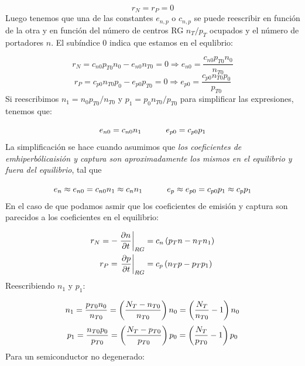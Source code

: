 \begin{equation}
	r_N = r_P = 0
\end{equation}
Luego tenemos que una de las constantes $e_{n,p}$ o $c_{n,p}$ se puede reescribir en función de la otra y en función del número de centros RG $n_T/p_T$ ocupados y el número de portadores $n$. El subíndice $0$ indica que estamos en el equlibrio:

\begin{equation}
	r_N = c_{n0} p_{T0} n_0 - e_{n0} n_{T0} = 0 \Rightarrow e_{n0} = \frac{c_{n0} p_{T0}n_0}{n_{T0}}
\end{equation}
\begin{equation}
	r_P = c_{p0} n_{T0} p_0 - e_{p0} p_{T0} = 0 \Rightarrow e_{p0} = \frac{c_{p0} n_{T0} p_0 }{p_{T0}}
\end{equation}
Si reescribimos $n_1=n_0p_{T0}/n_{T0}$ y $p_1=p_0n_{T0}/p_{T0}$ para simplificar las expresiones, tenemos que:

\begin{equation}
	e_{n0} = c_{n0} n_1 \quad \quad \quad e_{p0} = c_{p0} p_1
\end{equation}
La simplificación se hace cuando asumimos que \textit{los coeficientes de emhiperbólicaisión y captura son aproximadamente los mismos en el equilibrio y fuera del equilibrio}, tal que

\begin{equation}
	e_n\approx e_{n0} = c_{n0} n_1 \approx c_n n_1 \quad \quad \quad
	e_p\approx e_{p0} = c_{p0} p_1 \approx c_p p_1
\end{equation}
En el caso de que podamos asmir que los coeficientes de emisión y captura son parecidos a los coeficientes en el equilibrio:

\begin{equation}
	\begin{split}
		r_N = - \eval{\parciales{n}{t}}_{{RG}} & = c_n \parentesis{p_T n - n_T n_1} \\
		r_P =  \eval{\parciales{p}{t}}_{RG}    & = c_p \parentesis{n_T p - p_T p_1}
	\end{split}
\end{equation}
Reescribiendo $n_1$ y $p_1$:

\begin{equation}
	n_1 = \frac{p_{T0} n_0}{n_{T0}} = \left( \frac{N_T-n_{T0}}{n_{T0}} \right) n_0 = \left( \frac{N_T}{n_{T0}}-1 \right) n_0
\end{equation}
\begin{equation}
	p_1 = \frac{n_{T0}p_0}{p_{T0}} = \left( \frac{N_T-p_{T0}}{p_{T0}} \right) p_0 = \left( \frac{N_T}{p_{T0}}-1 \right) p_0
\end{equation}
Para un semiconductor no degenerado:

